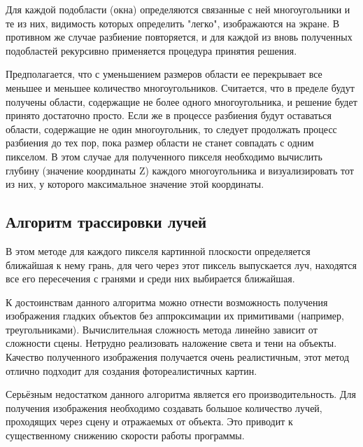 Для каждой подобласти (окна) определяются связанные с ней многоугольники и те из них, видимость которых определить "легко", изображаются на экране. В противном же случае разбиение повторяется, и для каждой из вновь полученных подобластей рекурсивно применяется процедура принятия решения.

Предполагается, что с уменьшением размеров области ее перекрывает все меньшее и меньшее количество многоугольников. Считается, что в пределе будут получены области, содержащие не более одного многоугольника, и решение будет принято достаточно просто. Если же в процессе разбиения будут оставаться области, содержащие не один многоугольник, то следует продолжать процесс разбиения до тех пор, пока размер области не станет совпадать с одним пикселом. В этом случае для полученного пикселя необходимо вычислить глубину (значение координаты Z) каждого многоугольника и визуализировать тот из них, у которого максимальное значение этой координаты.


\subsection{Алгоритм трассировки лучей}
В этом методе для каждого пикселя картинной плоскости определяется ближайшая к нему грань, для чего через этот пиксель выпускается луч, находятся все его пересечения с гранями и среди них выбирается ближайшая.
 
К достоинствам данного алгоритма можно отнести возможность получения изображения гладких объектов без аппроксимации их примитивами (например, треугольниками). Вычислительная сложность метода линейно зависит от сложности сцены. Нетрудно реализовать наложение света и тени на объекты. Качество полученного изображения получается очень реалистичным, этот метод отлично подходит для создания фотореалистичных картин.

Серьёзным недостатком данного алгоритма является его производительность. Для получения изображения необходимо создавать большое количество лучей, проходящих через сцену и отражаемых от объекта. Это приводит к существенному снижению скорости работы программы.


